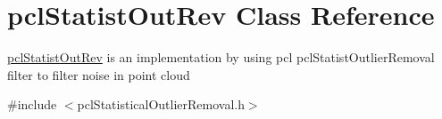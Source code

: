 \hypertarget{classpclStatistOutRev}{}\section{pcl\+Statist\+Out\+Rev Class Reference}
\label{classpclStatistOutRev}


\hyperlink{classpclStatistOutRev}{pcl\+Statist\+Out\+Rev} is an implementation by using pcl pcl\+Statist\+Outlier\+Removal filter to filter noise in point cloud
\begin{DoxyItemize}
\item 
\end{DoxyItemize} 




{\ttfamily \#include $<$pcl\+Statistical\+Outlier\+Removal.\+h$>$}

